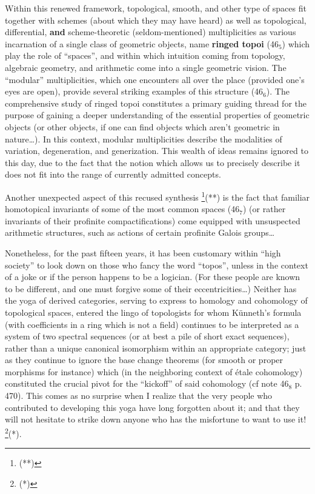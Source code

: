 Within this renewed framework, topological, smooth, and other type of spaces
fit together with schemes (about which they may have heard) 
as well as topological, differential, \textbf{and} scheme-theoretic
(seldom-mentioned) multiplicities
as various incarnation of 
a single class of geometric objects, name \textbf{ringed topoi} 
(46$_5$) which play the role of ``spaces'', and within 
which intuition coming from topology, algebraic geometry, and arithmetic come
into a single geometric vision.
The ``modular'' multiplicities,
which one encounters all over the place
(provided one's eyes are open), provide several striking examples of this structure (46$_6$).
The comprehensive study of ringed topoi constitutes a primary guiding thread for the
purpose of gaining a deeper understanding of the essential properties of geometric
objects (or other objects, if one can find objects which aren't geometric in
nature\ldots).
In this context, modular multiplicities describe the modalities of variation,
degeneration, and generization.
This wealth of ideas remains ignored to this day, 
due to the fact that the notion which allows us to precisely describe it does not fit into 
the range of currently admitted concepts.

Another unexpected aspect of this recused synthesis
\footnote{(**)}(**)
is the fact that familiar homotopical invariants 
of some of the most common spaces
(46$_7$)
(or rather invariants of their profinite compactifications) 
come equipped with unsuspected arithmetic structures, such as actions of certain profinite
Galois groups\ldots

Nonetheless, for the past fifteen years, it has been customary within ``high society'' to 
look down on those who fancy the word ``topos'', unless in the context of a
joke or if the person happens to be a logician.
(For these people are known to be different, and one must forgive some of their
eccentricities\ldots)
Neither has the yoga of derived categories, serving to express to homology and cohomology
of topological spaces, entered the lingo of topologists for whom K\"unneth's formula
(with coefficients in a ring which is not a field)
continues to be interpreted as a system of two spectral sequences (or at best a pile of
short exact sequences), 
rather than a unique canonical isomorphism within an appropriate category;
just as they continue to ignore the base change theorems (for smooth or proper morphisms
for instance) which (in the neighboring context of \'etale cohomology) constituted the
crucial pivot for the ``kickoff'' of said cohomology (cf note 46$_8$ p. 470).
This comes as no surprise when I realize that the very people who contributed to developing
this yoga have long forgotten about it; and that they will not hesitate to 
strike down anyone who has the misfortune to want to use it!
\footnote{(*)}(*).

